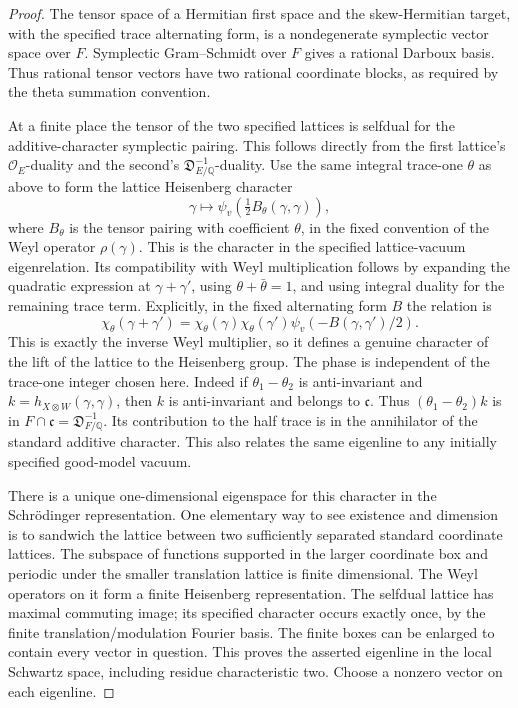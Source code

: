 \begin{proof}
The tensor space of a Hermitian first space and the skew-Hermitian
target, with the specified trace alternating form, is a
nondegenerate symplectic vector space over \(F\).
Symplectic Gram--Schmidt over \(F\) gives a rational Darboux basis.
Thus rational tensor vectors have two rational coordinate blocks,
as required by the theta summation convention.

At a finite place the tensor of the two specified lattices is
selfdual for the additive-character symplectic pairing.
This follows directly from the first lattice's
\(\mathcal O_E\)-duality and the second's
\(\mathfrak D_{E/\mathbb Q}^{-1}\)-duality.
Use the same integral trace-one \(\theta\) as above to form the
lattice Heisenberg character
\[
 \gamma\longmapsto
 \psi_v\!\left(\tfrac12 B_\theta(\gamma,\gamma)\right),
 \tag{M2}\label{eq:sr-theta-vacuum-character}
\]
where \(B_\theta\) is the tensor pairing with coefficient
\(\theta\), in the fixed convention of the Weyl operator
\(\rho(\gamma)\). This is the character in the specified
lattice-vacuum eigenrelation. Its compatibility with Weyl
multiplication follows by expanding the quadratic expression
at \(\gamma+\gamma'\), using
\(\theta+\bar\theta=1\), and using integral duality for the
remaining trace term. Explicitly, in the fixed alternating
form \(B\) the relation is
\[
 \chi_\theta(\gamma+\gamma')
   =\chi_\theta(\gamma)\chi_\theta(\gamma')
                      \psi_v(-B(\gamma,\gamma')/2).
\]
This is exactly the inverse Weyl multiplier, so it defines
a genuine character of the lift of the lattice to the
Heisenberg group. The phase is independent of the trace-one
integer chosen here. Indeed if \(\theta_1-\theta_2\) is
anti-invariant and \(k=h_{X\otimes W}(\gamma,\gamma)\),
then \(k\) is anti-invariant and belongs to \(\mathfrak c\).
Thus \((\theta_1-\theta_2)k\) is in
\(F\cap\mathfrak c=\mathfrak D_{F/\mathbb Q}^{-1}\).
Its contribution to the half trace is in the annihilator
of the standard additive character. This also relates the
same eigenline to any initially specified good-model vacuum.

There is a unique one-dimensional eigenspace for this character
in the Schr\"odinger representation. One elementary way to
see existence and dimension is to sandwich the lattice between
two sufficiently separated standard coordinate lattices.
The subspace of functions supported in the larger coordinate
box and periodic under the smaller translation lattice is
finite dimensional. The Weyl operators on it form a finite
Heisenberg representation. The selfdual lattice has maximal
commuting image; its specified character occurs exactly once,
by the finite translation/modulation Fourier basis.
The finite boxes can be enlarged to contain every vector in
question. This proves the asserted eigenline in the local
Schwartz space, including residue characteristic two.
Choose a nonzero vector on each eigenline.


\end{proof}
